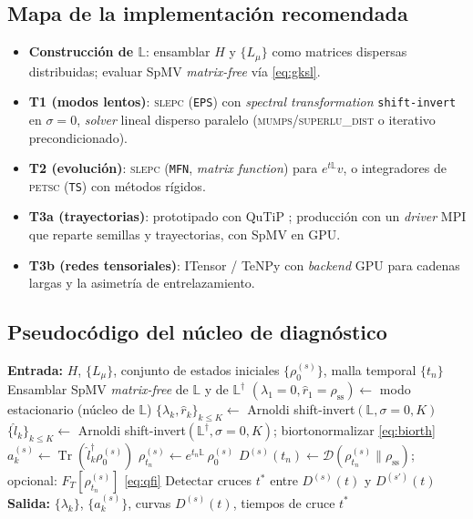 \documentclass[11pt,a4paper]{article}
\theoremstyle{definition}
\theoremstyle{plain}
\newcommand{\Dop}{\mathcal{D}}
\newcommand{\rss}{\rho_{\mathrm{ss}}}
\renewcommand{\Tr}{\operatorname{Tr}}
\begin{document}
\subsection{Mapa de la implementación recomendada}

\begin{itemize}[leftmargin=1.6em,itemsep=2pt]
\item \textbf{Construcción de $\mathbb{L}$}: ensamblar $H$ y $\{L_\mu\}$ como matrices dispersas
distribuidas; evaluar SpMV \emph{matrix-free} vía \eqref{eq:gksl}.
\item \textbf{T1 (modos lentos)}: \textsc{slepc} (\texttt{EPS}) con \emph{spectral transformation}
\texttt{shift-invert} en $\sigma=0$, \emph{solver} lineal disperso paralelo (\textsc{mumps}/\textsc{superlu\_dist}
o iterativo precondicionado).
\item \textbf{T2 (evolución)}: \textsc{slepc} (\texttt{MFN}, \emph{matrix function}) para $e^{t\mathbb{L}}v$, o
integradores de \textsc{petsc} (\texttt{TS}) con métodos rígidos.
\item \textbf{T3a (trayectorias)}: prototipado con QuTiP \cite{Johansson2013}; producción con un
\emph{driver} MPI que reparte semillas y trayectorias, con SpMV en GPU.
\item \textbf{T3b (redes tensoriales)}: ITensor / TeNPy con \emph{backend} GPU para cadenas largas y la
asimetría de entrelazamiento.
\end{itemize}

\subsection{Pseudocódigo del núcleo de diagnóstico}

\begin{algorithm}[h]
\caption{Diagnóstico del QMpE (espectral + curvas de distancia)}
\begin{algorithmic}[1]
\State \textbf{Entrada:} $H$, $\{L_\mu\}$, conjunto de estados iniciales $\{\rho_0^{(s)}\}$, malla temporal $\{t_n\}$
\State Ensamblar SpMV \emph{matrix-free} de $\mathbb{L}$ y de $\mathbb{L}^{\dagger}$ 
\State $(\lambda_1{=}0,\hat r_1{=}\rss)\gets$ modo estacionario (núcleo de $\mathbb{L}$) 
\State $\{\lambda_k,\hat r_k\}_{k\le K}\gets$ Arnoldi shift-invert$(\mathbb{L},\sigma{=}0,K)$ 
\State $\{\hat l_k\}_{k\le K}\gets$ Arnoldi shift-invert$(\mathbb{L}^{\dagger},\sigma{=}0,K)$; biortonormalizar \eqref{eq:biorth}
  \State $a_k^{(s)}\gets \Tr(\hat l_k^{\dagger}\rho_0^{(s)})$ 
    \State $\rho_{t_n}^{(s)}\gets e^{t_n\mathbb{L}}\,\rho_0^{(s)}$ 
    \State $D^{(s)}(t_n)\gets \Dop(\rho_{t_n}^{(s)}\|\rss)$; \; opcional: $F_T[\rho_{t_n}^{(s)}]$ \eqref{eq:qfi}
  \EndFor
\EndFor
\State Detectar cruces $t^{*}$ entre $D^{(s)}(t)$ y $D^{(s')}(t)$ 
\State \textbf{Salida:} $\{\lambda_k\}$, $\{a_k^{(s)}\}$, curvas $D^{(s)}(t)$, tiempos de cruce $t^{*}$
\end{algorithmic}
\end{algorithm}
\end{document}
